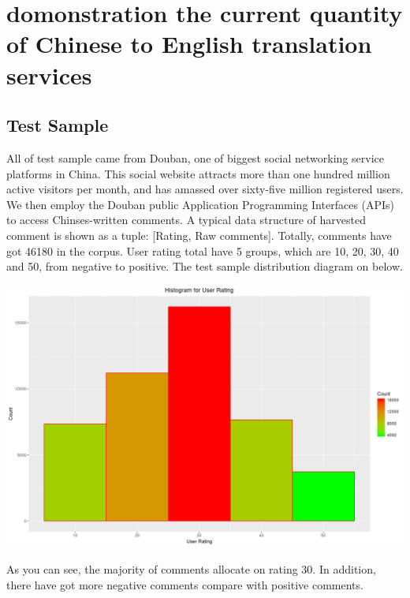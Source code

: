 \documentclass[conference]{IEEEtran}
\begin{document}
\section{domonstration the current quantity of Chinese to English translation services}

\subsection{Test Sample}
All of test sample came from Douban, one of biggest social networking service
platforms in China. This social website attracts more than one hundred million
active visitors per month, and has amassed over sixty-five million registered
users. We then employ the Douban public Application Programming Interfaces
(APIs) to access Chinses-written comments. A typical data structure of harvested
comment is shown as a tuple: [Rating, Raw comments]. Totally, comments have got
46180 in the corpus. User rating total have 5 groups, which are 10, 20, 30, 40
and 50, from negative to positive.
The test sample distribution diagram on below.
\centerline{\includegraphics[width=0.3\paperwidth]{./img/ratingHis.png}}
As you can see, the majority of comments allocate on rating 30. In addition,
there have got more negative comments compare with positive comments.
\end{document}
